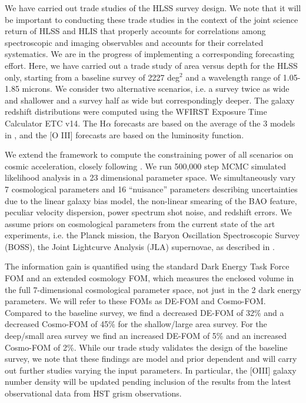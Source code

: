  We have carried out trade studies of the HLSS survey design. We note that it
 will be important to conducting these trade studies in the context of the joint
 science return of HLSS and HLIS that properly accounts for correlations among
 spectroscopic and imaging observables and accounts for their correlated
 systematics.  We are in the progress of implementing a corresponding forecasting
 effort.  Here, we have carried out a trade study of area versus depth for the
 HLSS only, starting from a baseline survey of 2227 deg$^2$ and a wavelength
 range of 1.05-1.85 microns. We consider two alternative scenarios, i.e. a survey
 twice as wide and shallower and a survey half as wide but correspondingly
 deeper.  The galaxy redshift distributions were computed using the WFIRST
 Exposure Time Calculator ETC v14. The H$\alpha$ forecasts are based on the average
 of the 3 models in \citet{Pozzetti:2016}, and the [O III] forecasts are based
 on the \citet{Mehta:2015} luminosity function.

 We extend the \CoLi framework \citep{Eifler:2014,Krause2016} to compute the constraining power of all scenarios on cosmic acceleration, closely following \citet{Wang2013}. We run 500,000 step
 MCMC simulated likelihood analysis in a 23 dimensional parameter space. We
 simultaneously vary 7 cosmological parameters and 16 ``nuisance'' parameters
 describing uncertainties due to the linear galaxy bias model, the non-linear
 smearing of the BAO feature, peculiar velocity dispersion, power spectrum shot
 noise, and redshift errors. We assume priors on cosmological parameters from the
 current state of the art experiments, i.e. the Planck mission, the Baryon
 Oscillation Spectroscopic Survey (BOSS), the Joint Lightcurve Analysis (JLA)
 supernovae, as described in \citet{Aubourg:2015}.

 The information gain is quantified using the standard Dark Energy Task Force FOM
 and an extended cosmology FOM, which measures the enclosed volume in the full
 7-dimensional cosmological parameter space, not just in the 2 dark energy
 parameters. We will refer to these FOMs as DE-FOM and Cosmo-FOM.  Compared to
 the baseline survey, we find a decreased DE-FOM of 32\% and a decreased
 Cosmo-FOM of 45\% for the shallow/large area survey. For the deep/small area
 survey we find an increased DE-FOM of 5\% and an increased Cosmo-FOM of 2\%.
 While our trade study validates the design of the baseline survey, we note that
 these findings are model and prior dependent and will carry out further studies
 varying the input parameters. In particular, the [OIII] galaxy number density
 will be updated pending inclusion of the results from the latest observational
 data from HST grism observations.

